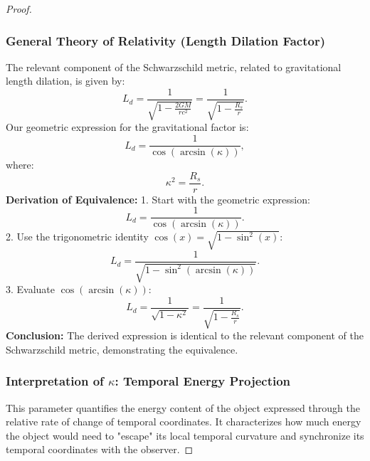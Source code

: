\documentclass{article}
\begin{document}
\begin{theorem}
\begin{proof}
\subsubsection{General Theory of Relativity (Length Dilation Factor)}
The relevant component of the Schwarzschild metric, related to gravitational length dilation, is given by:
\begin{equation}
L_d = \frac{1}{\sqrt{1 - \frac{2GM}{rc^2}}} = \frac{1}{\sqrt{1 - \frac{R_s}{r}}}.
\end{equation}
Our geometric expression for the gravitational factor is:
\begin{equation}
L_d = \frac{1}{\cos(\arcsin(\kappa))},
\end{equation}
where:
\begin{equation}
\kappa^2 = \frac{R_s}{r}.
\end{equation}
\textbf{Derivation of Equivalence:}
1. Start with the geometric expression:
\begin{equation}
L_d = \frac{1}{\cos(\arcsin(\kappa))}.
\end{equation}
2. Use the trigonometric identity \(\cos(x) = \sqrt{1 - \sin^2(x)}\):
\begin{equation}
L_d = \frac{1}{\sqrt{1 - \sin^2(\arcsin(\kappa))}}.
\end{equation}
3. Evaluate \(\cos(\arcsin(\kappa))\):
\begin{equation}
L_d = \frac{1}{\sqrt{1 - \kappa^2}}=
\frac{1}{\sqrt{1 - \frac{R_s}{r}}}.
\end{equation}
\textbf{Conclusion:} The derived expression is identical to the relevant component of the Schwarzschild metric, demonstrating the equivalence.

\subsubsection{Interpretation of \(\kappa\): Temporal Energy Projection}
This parameter quantifies the energy content of the object expressed through the relative rate of change of temporal coordinates. It characterizes how much energy the object would need to "escape" its local temporal curvature and synchronize its temporal coordinates with the observer.


\end{proof}
\end{theorem}
\end{document}
